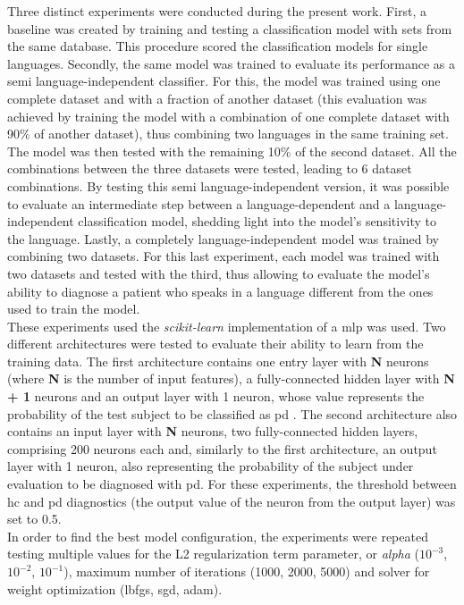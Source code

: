 Three distinct experiments were conducted during the present work. First, a baseline was created by training and testing a classification model with sets from the same database. This procedure scored the classification models for single languages. Secondly, the same model was trained to evaluate its performance as a semi language-independent classifier. For this, the model was trained using one complete dataset and with a fraction of another dataset (this evaluation was achieved by training the model with a combination of one complete dataset with 90\% of another dataset), thus combining two languages in the same training set. The model was then tested with the remaining 10\% of the second dataset. All the combinations between the three datasets were tested, leading to 6 dataset combinations. By testing this semi language-independent version, it was possible to evaluate an intermediate step between a language-dependent and a language-independent classification model, shedding light into the model's sensitivity to the language. Lastly, a completely language-independent model was trained by combining two datasets. For this last experiment, each model was trained with two datasets and tested with the third, thus allowing to evaluate the model's ability to diagnose a patient who speaks in a language different from the ones used to train the model.
\\
These experiments used the \textit{scikit-learn} implementation \cite{scikit-learn} of a \gls{mlp} was used. Two different architectures were tested to evaluate their ability to learn from the training data. The first architecture contains one entry layer with \textbf{N} neurons (where \textbf{N} is the number of input features), a fully-connected hidden layer with \textbf{N + 1} neurons and an output layer with 1 neuron, whose value represents the probability of the test subject to be classified as \gls{pd} \cite{alzheimer_2014_1}. The second architecture also contains an input layer with \textbf{N} neurons, two fully-connected hidden layers, comprising 200 neurons each and, similarly to the first architecture, an output layer with 1 neuron, also representing the probability of the subject under evaluation to be diagnosed with \gls{pd}. For these experiments, the threshold between \gls{hc} and \gls{pd} diagnostics (the output value of the neuron from the output layer) was set to 0.5.
\\
In order to find the best model configuration, the experiments were repeated testing multiple values for the L2 regularization term parameter, or \textit{alpha} ($ 10^{-3} $, $ 10 ^{-2} $, $ 10 ^{-1} $), maximum number of iterations (1000, 2000, 5000) and solver for weight optimization (lbfgs, sgd, adam). 

